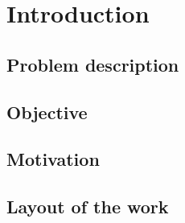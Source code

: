 \chapter{Introduction}
\section{Problem description}
\section{Objective}
\section{Motivation}
\section{Layout of the work}